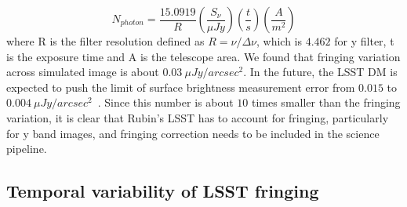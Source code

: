 \documentclass[twocolumn]{aastex63} %
\begin{document}
\begin{CJK*}{UTF8}{gbsn}
\begin{equation}
    N_{photon} = \frac{15.0919}{R}\left(\frac{S_\nu}{\mu Jy}\right)\left(\frac{t}{s}\right)\left(\frac{A}{m^2}\right)
\end{equation}
where R is the filter resolution defined as $R = \nu/\Delta\nu$, which is $4.462$ for y filter, t is the exposure time and A is the telescope area. We found that fringing variation across simulated image is about $0.03\ \mu Jy/arcsec^{2}$. In the future, the LSST DM is expected to push the limit of surface brightness measurement error from $0.015$ to $0.004\ \mu Jy/arcsec^{2}$~\citep{rlh}. Since this number is about $10$ times smaller than the fringing variation, it is clear that Rubin's LSST has to account for fringing, particularly for y band images, and fringing correction needs to be included in the science pipeline.

\subsection{Temporal variability of LSST fringing}


\end{CJK*}
\end{document}
